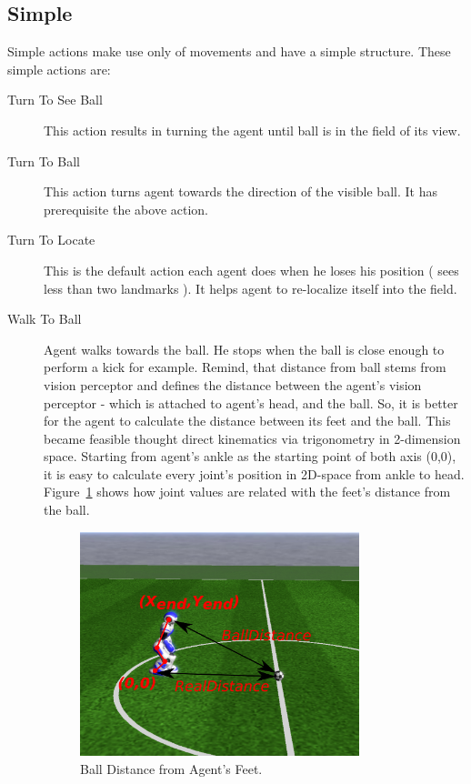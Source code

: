 \subsection{Simple}
Simple actions make use only of movements and have a simple structure. These simple actions are:
\begin{description}
 \item[Turn To See Ball] This action results in turning the agent until ball is in the field of its view.
 
 \item[Turn To Ball] This action turns agent towards the direction of the visible ball. It has prerequisite the above action.
 
 \item[Turn To Locate] This is the default action each agent does when he loses his position ( sees less than two landmarks ). It helps agent to re-localize itself into the field.
 
 \item[Walk To Ball] Agent walks towards the ball. He stops when the ball is close enough to perform a kick for example. Remind, that distance from ball stems from vision perceptor and defines the distance between the agent's vision perceptor - which is attached to agent's head, and the ball. So, it is better for the agent to calculate the distance between its feet and the ball. This became feasible thought direct kinematics via trigonometry in 2-dimension space. Starting from agent's ankle as the starting point of both axis (0,0), it is easy to calculate every joint's position in 2D-space from ankle to head. Figure~\ref{fig:2dkinematics} shows how joint values are related with the feet's distance from the ball.
 
 \begin{figure}[t!]
\centering
  \includegraphics[trim=0cm 4cm 0cm 4cm, clip,width=0.8\textwidth]   {Chapter3/figures/2dkinematics.pdf}
  \caption{Ball Distance from Agent's Feet.}
  \label{fig:2dkinematics}
\end{figure}



\end{description}
